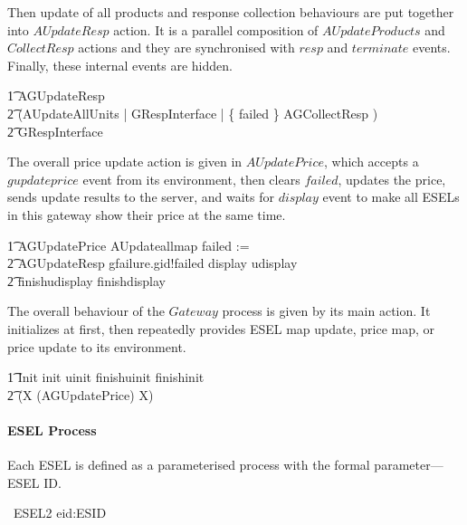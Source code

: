 Then update of all products and response collection behaviours are put together into $AUpdateResp$ action. It is a parallel composition of $AUpdateProducts$ and $CollectResp$ actions and they are synchronised with $resp$ and $terminate$ events. Finally, these internal events are hidden.
\begin{circusaction}
        \t1 AGUpdateResp \circdef \\
            \t2 (AUpdateAllUnits \lpar \emptyset | GRespInterface | \{ failed \} \rpar AGCollectResp ) \\
            \t2 \circhide GRespInterface \\
\end{circusaction}

The overall price update action is given in $AUpdatePrice$, which accepts a $gupdateprice$ event from its environment, then clears $failed$, updates the price, sends update results to the server, and waits for $display$ event to make all ESELs in this gateway show their price at the same time.
\begin{circusaction}
        \t1 AGUpdatePrice \circdef AUpdateallmap \circseq failed := \emptyset \circseq \\
            \t2 AGUpdateResp \circseq gfailure.gid!failed \then display \then udisplay \then \\
            \t2 finishudisplay \then finishdisplay \then \Skip \\ 
\end{circusaction}

The overall behaviour of the $Gateway$ process is given by its main action. It initializes at first, then repeatedly provides ESEL map update, price map, or price update to its environment.
\begin{circusaction}
	\t1 \circspot \lschexpract Init \rschexpract \circseq init \then uinit \then finishuinit \then finishinit \then \Skip \circseq \\
    \t2 (\circmu X \circspot (AGUpdatePrice) \circseq X) \\
\end{circusaction}

\begin{circus}
	\circend
\end{circus}

%
\paragraph{ESEL Process}

Each ESEL is defined as a parameterised process with the formal parameter---ESEL ID.
\begin{circus}
	\circprocess\ ESEL2 \circdef eid:ESID \circspot \circbegin \\
\end{circus}

